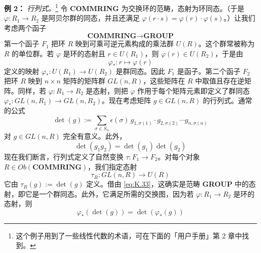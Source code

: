 \textbf{例 2：} \textit{行列式。}\footnote{这个例子用到了一些线性代数的术语，可在下面的「用户手册」第 2 章中找到。} 令 \textbf{COMMRING} 为交换环的范畴，态射为环同态。（于是 $\varphi:R_1\to R_2$ 是阿贝尔群的同态，并且还满足 $\varphi(r\cdot s)=\varphi(r)\cdot\varphi(s)$。）让我们考虑两个函子
\begin{equation}
\textbf{COMMRING}\to\textbf{GROUP}
\tag{K.30}
\label{eq:K.30}
\end{equation}
第一个函子 $F_1$ 把环 $R$ 映到可乘可逆元素构成的乘法群 $U(R)$。这个群常被称为 $R$ 的单位群。若 $\varphi$ 是环的态射且 $r\in U(R_1)$，则 $\varphi(r)\in U(R_2)$，于是由
\begin{equation}
\varphi_*:r\mapsto\varphi(r)
\tag{K.31}
\label{eq:K.31}
\end{equation}
定义的映射 $\varphi_*:U(R_1)\to U(R_2)$ 是群同态。因此 $F_1$ 是函子。第二个函子 $F_2$ 把环 $R$ 映到 $n\times n$ 矩阵的矩阵群 $GL(n,R)$，这些矩阵在 $R$ 中取值且存在逆矩阵。同样，若 $\varphi:R_1\to R_2$ 是态射，则把 $\varphi$ 作用于每个矩阵元素即定义了群同态 $\varphi_*:GL(n,R_1)\to GL(n,R_2)$。现在考虑矩阵 $g\in GL(n,R)$ 的行列式。通常的公式
\begin{equation}
\det(g):=\sum_{\sigma\in S_n}\epsilon(\sigma)\,g_{1,\sigma(1)}\cdot g_{2,\sigma(2)}\cdots g_{n,\sigma(n)}
\tag{K.32}
\label{eq:K.32}
\end{equation}
对 $g\in GL(n,R)$ 完全有意义。此外，
\begin{equation}
\det(g_1g_2)=\det(g_1)\det(g_2)
\tag{K.33}
\label{eq:K.33}
\end{equation}
现在我们断言，行列式定义了自然变换 $\tau:F_1\to F_2$。对每个对象 $R\in\mathit{Ob}(\textbf{COMMRING})$，我们指定态射
\begin{equation}
\tau_R:GL(n,R)\to U(R)
\tag{K.34}
\label{eq:K.34}
\end{equation}
它由 $\tau_R(g):=\det(g)$ 定义。借由 \eqref{eq:K.33}，这确实是范畴 \textbf{GROUP} 中的态射，即它是一个群同态。此外，它满足所需的交换图，因为若 $\varphi:R_1\to R_2$ 是环的态射，则
\begin{equation}
\varphi_*(\det(g))=\det(\varphi_*(g))
\tag{K.35}
\label{eq:K.35}
\end{equation}


